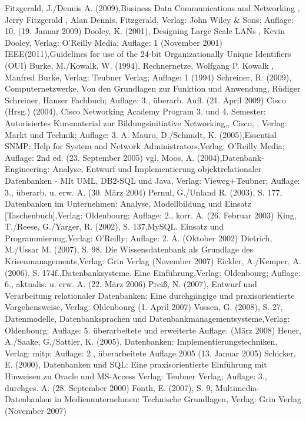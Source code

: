 Fitzgerald, J./Dennis A. (2009),Business Data Communications and Networking , Jerry Fitzgerald , Alan Dennis, Fitzgerald, Verlag: John Wiley \& Sons; Auflage: 10. (19. Januar 2009)
Dooley, K. (2001), Designing Large Scale LANs , Kevin Dooley, Verlag: O'Reilly Media; Auflage: 1 (November 2001)
IEEE(2011),Guidelines for use of the 24-bit Organizationally Unique Identifiers (OUI)
Burke, M./Kowalk, W. (1994), Rechnernetze, Wolfgang P. Kowalk , Manfred Burke, Verlag: Teubner Verlag; Auflage: 1 (1994)
Schreiner, R. (2009), Computernetzwerke. Von den Grundlagen zur Funktion und Anwendung, Rüdiger Schreiner, Hanser Fachbuch; Auflage: 3., überarb. Aufl. (21. April 2009)
Cisco (Hrsg.) (2004), Cisco Networking Academy Program 3. und 4. Semester: Autorisiertes Kursmaterial zur Bildungsinitiative Networking,, Cisco, , Verlag: Markt und Technik; Auflage: 3. A. 
Mauro, D./Schmidt, K. (2005),Essential SNMP: Help for System and Network Administrators,Verlag: O'Reilly Media; Auflage: 2nd ed. (23. September 2005)
vgl. Moos, A. (2004),Datenbank-Engineering: Analyse, Entwurf und Implementierung objektrelationaler Datenbanken - MIt UML, DB2-SQL und Java, Verlag: Vieweg+Teubner; Auflage: 3., überarb. u. erw. A. (30. März 2004)
Pernul, G./Unland R. (2003), S. 177, Datenbanken im Unternehmen: Analyse, Modellbildung und Einsatz [Taschenbuch],Verlag: Oldenbourg; Auflage: 2., korr. A. (26. Februar 2003)
King, T./Reese, G./Yarger, R. (2002), S. 137,MySQL. Einsatz und Programmierung,Verlag: O'Reilly; Auflage: 2. A. (Oktober 2002)
Dietrich, M./Ussar M. (2007), S. 98, Die Wissensdatenbank als Grundlage des Krisenmanagements,Verlag: Grin Verlag (November 2007)
Eickler, A./Kemper, A. (2006), S. 174f.,Datenbanksysteme. Eine Einführung,Verlag: Oldenbourg; Auflage: 6., aktualis. u. erw. A. (22. März 2006)
Preiß, N. (2007), Entwurf und Verarbeitung relationaler Datenbanken: Eine durchgängige und praxisorientierte Vorgehensweise, Verlag: Oldenbourg (1. April 2007)
Vossen, G. (2008), S. 27, Datenmodelle, Datenbanksprachen und Datenbankmanagementsysteme,Verlag: Oldenbourg; Auflage: 5. überarbeitete und erweiterte Auflage. (März 2008)
Heuer, A./Saake, G./Sattler, K. (2005), Datenbanken: Implementierungstechniken, Verlag: mitp; Auflage: 2., überarbeitete Auflage 2005 (13. Januar 2005)
Schicker, E. (2000), Datenbanken und SQL: Eine praxisorientierte Einführung mit Hinweisen zu Oracle und MS-Access Verlag: Teubner Verlag; Auflage: 3., durchges. A. (28. September 2000)
Fonth, E. (2007), S. 9, Multimedia-Datenbanken in Medienunternehmen: Technische Grundlagen, Verlag: Grin Verlag (November 2007)

